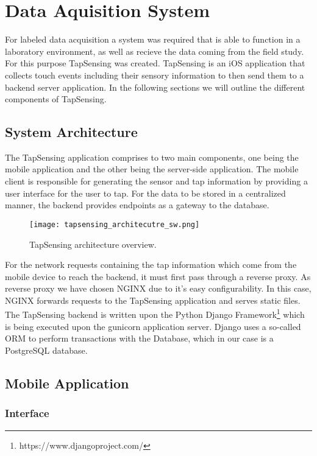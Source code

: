 \chapter{Data Aquisition System\label{cha:chapter3}}
For labeled data acquisition a system was required that is able to function in a laboratory environment, as well as recieve the data coming from the field study. For this purpose TapSensing was created. TapSensing is an iOS application that collects touch events including their sensory information to then send them to a backend server application. In the following sections we will outline the different components of TapSensing. 

\section{System Architecture}
The TapSensing application comprises to two main components, one being the mobile application and the other being the server-side application. The mobile client is responsible for generating the sensor and tap information by providing a user interface for the user to tap. For the data to be stored in a centralized manner, the backend provides endpoints as a gateway to the database.

\begin{figure}[h!]
  \centering
  \texttt{[image: tapsensing\_architecutre\_sw.png]}
  \caption{TapSensing architecture overview.}
\end{figure}

For the network requests containing the tap information which come from the mobile device to reach the backend, it must first pass through a reverse proxy. As reverse proxy we have chosen NGINX due to it's easy configurability. In this case, NGINX forwards requests to the TapSensing application and serves static files.\\
The TapSensing backend is written upon the Python Django Framework\footnote{https://www.djangoproject.com/} which is being executed upon the gunicorn application server. Django uses a so-called ORM to perform transactions with the Database, which in our case is a PostgreSQL database.

\section{Mobile Application}
\subsection{Interface}
